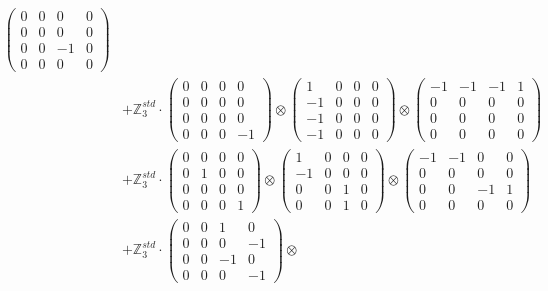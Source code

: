 \documentclass{article}
\begin{document}
{\begin{align}
            \begin{pmatrix} 0 & 0 & 0 & 0 \\ 0 & 0 & 0 & 0 \\ 0 & 0 & -1 & 0 \\ 0 & 0 & 0 & 0 \end{pmatrix} \\ 
        &+ \label{Rs1-Rc16-Solution-6-c7} \mathbb{Z}_3^{std} \cdot 
            \begin{pmatrix} 0 & 0 & 0 & 0 \\ 0 & 0 & 0 & 0 \\ 0 & 0 & 0 & 0 \\ 0 & 0 & 0 & -1 \end{pmatrix} \otimes 
            \begin{pmatrix} 1 & 0 & 0 & 0 \\ -1 & 0 & 0 & 0 \\ -1 & 0 & 0 & 0 \\ -1 & 0 & 0 & 0 \end{pmatrix} \otimes 
            \begin{pmatrix} -1 & -1 & -1 & 1 \\ 0 & 0 & 0 & 0 \\ 0 & 0 & 0 & 0 \\ 0 & 0 & 0 & 0 \end{pmatrix} \\ 
        &+ \label{Rs1-Rc16-Solution-6-c8} \mathbb{Z}_3^{std} \cdot 
            \begin{pmatrix} 0 & 0 & 0 & 0 \\ 0 & 1 & 0 & 0 \\ 0 & 0 & 0 & 0 \\ 0 & 0 & 0 & 1 \end{pmatrix} \otimes 
            \begin{pmatrix} 1 & 0 & 0 & 0 \\ -1 & 0 & 0 & 0 \\ 0 & 0 & 1 & 0 \\ 0 & 0 & 1 & 0 \end{pmatrix} \otimes 
            \begin{pmatrix} -1 & -1 & 0 & 0 \\ 0 & 0 & 0 & 0 \\ 0 & 0 & -1 & 1 \\ 0 & 0 & 0 & 0 \end{pmatrix} \\ 
        &+ \label{Rs1-Rc16-Solution-6-c9} \mathbb{Z}_3^{std} \cdot 
            \begin{pmatrix} 0 & 0 & 1 & 0 \\ 0 & 0 & 0 & -1 \\ 0 & 0 & -1 & 0 \\ 0 & 0 & 0 & -1 \end{pmatrix} \otimes 

\end{align}}
\end{document}
